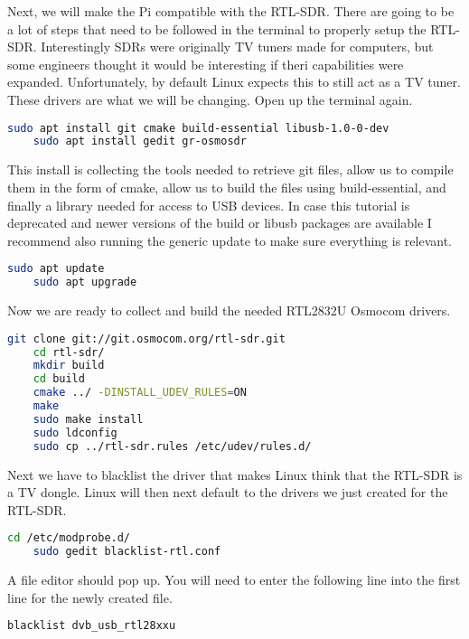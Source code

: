 \documentclass[letterpaper,12pt,notitlepage]{report} %
\begin{document}
Next, we will make the Pi compatible with the RTL-SDR. There are going to be a lot of steps that need to be followed in the terminal to properly setup the RTL-SDR. Interestingly SDRs were originally TV tuners made for computers, but some engineers thought it would be interesting if theri capabilities were expanded. Unfortunately, by default Linux expects this to still act as a TV tuner. These drivers are what we will be changing. Open up the terminal again.

\begin{lstlisting}[language=bash]
	sudo apt install git cmake build-essential libusb-1.0-0-dev 
	sudo apt install gedit gr-osmosdr
\end{lstlisting}

This install is collecting the tools needed to retrieve git files, allow us to compile them in the form of cmake, allow us to build the files using build-essential, and finally a library needed for access to USB devices. In case this tutorial is deprecated and newer versions of the build or libusb packages are available I recommend also running the generic update to make sure everything is relevant.

\begin{lstlisting}[language=bash]
	sudo apt update
	sudo apt upgrade
\end{lstlisting}

Now we are ready to collect and build the needed RTL2832U Osmocom drivers.

\begin{lstlisting}[language=bash]
	git clone git://git.osmocom.org/rtl-sdr.git
	cd rtl-sdr/
	mkdir build
	cd build
	cmake ../ -DINSTALL_UDEV_RULES=ON
	make
	sudo make install
	sudo ldconfig
	sudo cp ../rtl-sdr.rules /etc/udev/rules.d/
\end{lstlisting}

Next we have to blacklist the driver that makes Linux think that the RTL-SDR is a TV dongle. Linux will then next default to the drivers we just created for the RTL-SDR.

\begin{lstlisting}[language=bash]
	cd /etc/modprobe.d/
	sudo gedit blacklist-rtl.conf
\end{lstlisting}

A file editor should pop up. You will need to enter the following line into the first line for the newly created file.

\begin{lstlisting}[language=bash]
	blacklist dvb_usb_rtl28xxu
\end{lstlisting}
\end{document}
